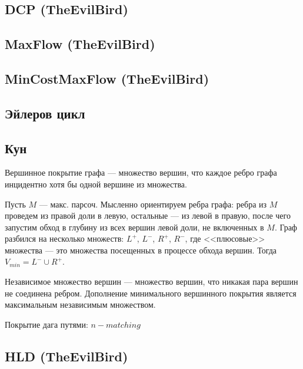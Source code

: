 \documentclass[a4paper]{article}
\begin{document}
\begin{multicols*}{2}
        \subsection{DCP (TheEvilBird)}
            
        
        \subsection{MaxFlow (TheEvilBird)}
            
                
        \subsection{MinCostMaxFlow (TheEvilBird)}
            
        
        \subsection{Эйлеров цикл}
            
        \subsection{Кун}
            

        Вершинное покрытие графа --- множество вершин, что каждое ребро графа инцидентно хотя бы одной вершине из множества.
        
        Пусть $M$ --- макс. парсоч. Мысленно ориентируем ребра графа: ребра из $M$ проведем из правой доли в левую, остальные --- из левой в правую, 
        после чего запустим обход в глубину из всех вершин левой доли, не включенных в $M$.
        Граф разбился на несколько множеств: $L^{+}$, $L^{-}$, $R^{+}$, $R^{-}$, где <<плюсовые>> множества --- это множества посещенных в процессе обхода вершин. Тогда $V_{min} = L^{-} \cup R^{+}$.

        Независимое множество вершин ---  множество вершин, что никакая пара вершин не соединена ребром. Дополнение минимального вершинного покрытия является максимальным независимым множеством.

        Покрытие дага путями: $n - matching$
        
        \subsection{HLD (TheEvilBird)}
            


\end{multicols*}
\end{document}

